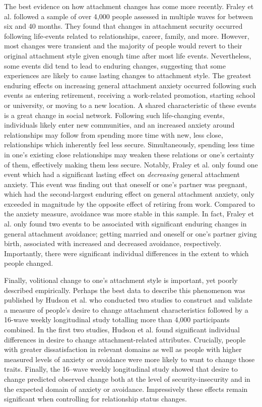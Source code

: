 \documentclass[12pt]{report}
\begin{document}
The best evidence on how attachment changes has come more recently.
Fraley et al. \citeyear{Fraley2021} followed a sample of over 4,000 people assessed in multiple waves for between six and 40 months.
They found that changes in attachment security occurred following life-events related to relationships, career, family, and more. However, most changes were transient and the majority of people would revert to their original attachment style given enough time after most life events.
Nevertheless, some events did tend to lead to enduring changes, suggesting that some experiences are likely to cause lasting changes to attachment style.
The greatest enduring effects on increasing general attachment anxiety occurred following such events as entering retirement, receiving a work-related promotion, starting school or university, or moving to a new location. A shared characteristic of these events is a great change in social network. Following such life-changing events, individuals likely enter new communities, and an increased anxiety around relationships may follow from spending more time with new, less close, relationships which inherently feel less secure.
Simultaneously, spending less time in one's existing close relationships may weaken these relations or one's certainty of them, effectively making them less secure.
Notably, Fraley et al. only found one event which had a significant lasting effect on \textit{decreasing} general attachment anxiety. This event was finding out that oneself or one's partner was pregnant, which had the second-largest enduring effect on general attachment anxiety, only exceeded in magnitude by the opposite effect of retiring from work.
Compared to the anxiety measure, avoidance was more stable in this sample.
In fact, Fraley et al. only found two events to be associated with significant enduring changes in general attachment avoidance; getting married and oneself or one's partner giving birth, associated with increased and decreased avoidance, respectively.
Importantly, there were significant individual differences in the extent to which people changed.

Finally, volitional change to one's attachment style is important, yet poorly described empirically.
Perhaps the best data to describe this phenomenon was published by Hudson et al. \citeyear{Hudson2020} who conducted two studies to construct and validate a measure of people's desire to change attachment characteristics followed by a 16-wave weekly longitudinal study totalling more than 4,000 participants combined.
In the first two studies, Hudson et al. found significant individual differences in desire to change attachment-related attributes.
Crucially, people with greater dissatisfaction in relevant domains as well as people with higher measured levels of anxiety or avoidance were more likely to want to change those traits.
Finally, the 16–wave weekly longitudinal study showed that desire to change predicted observed change both at the level of security-insecurity and in the expected domain of anxiety or avoidance.
Impressively these effects remain significant when controlling for relationship status changes.
\end{document}

